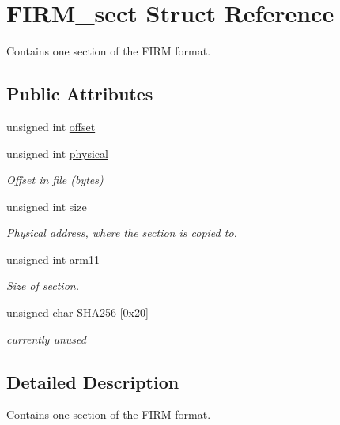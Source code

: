 \hypertarget{struct_f_i_r_m__sect}{}\section{F\+I\+R\+M\+\_\+sect Struct Reference}
\label{struct_f_i_r_m__sect}


Contains one section of the F\+I\+R\+M format.  


\subsection*{Public Attributes}
\begin{DoxyCompactItemize}
\item 
unsigned int \hyperlink{struct_f_i_r_m__sect_a38377a781b05475fb3f23bb4c3044f6f}{offset}
\item 
unsigned int \hyperlink{struct_f_i_r_m__sect_a8a89063765a471aa8e823d2d673a549e}{physical}
\begin{DoxyCompactList}\small\item\em Offset in file (bytes) \end{DoxyCompactList}\item 
unsigned int \hyperlink{struct_f_i_r_m__sect_a9e91b2a4f35d02c240ff8fed515ca4f4}{size}
\begin{DoxyCompactList}\small\item\em Physical address, where the section is copied to. \end{DoxyCompactList}\item 
unsigned int \hyperlink{struct_f_i_r_m__sect_a1adcbe3a44c9e970460544dcf183a00d}{arm11}
\begin{DoxyCompactList}\small\item\em Size of section. \end{DoxyCompactList}\item 
unsigned char \hyperlink{struct_f_i_r_m__sect_a1fe1f999e70cc68c0435bf48ab66c895}{S\+H\+A256} \mbox{[}0x20\mbox{]}
\begin{DoxyCompactList}\small\item\em currently unused \end{DoxyCompactList}\end{DoxyCompactItemize}


\subsection{Detailed Description}
Contains one section of the F\+I\+R\+M format. 

